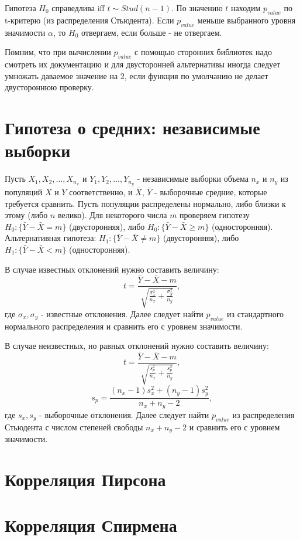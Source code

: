 Гипотеза $H_0$ справедлива iff $t \sim Stud(n - 1)$. По значению $t$ находим $p_{value}$ по t-критерю (из распределения Стьюдента). Если $p_{value}$ меньше выбранного уровня значимости $\alpha$, то $H_0$ отвергаем, если больше - не отвергаем.

Помним, что при вычислении $p_{value}$ с помощью сторонних библиотек надо смотреть их документацию и для двусторонней альтернативы иногда следует умножать даваемое значение на 2, если функция по умолчанию не делает двустороннюю проверку.  


\section{Гипотеза о средних: независимые выборки}

Пусть $X_1, X_2, ..., X_{n_x}$ и $Y_1, Y_2, ..., Y_{n_y}$ - независимые выборки объема $n_x$ и $n_y$ из популяций $X$ и $Y$ соответственно, и $\bar{X}$, $\bar{Y}$ - выборочные средние, которые требуется сравнить.
Пусть популяции распределены нормально, либо близки к этому (либо $n$ велико).
Для некоторого числа $m$ проверяем гипотезу $H_0: \{ \bar{Y} - \bar{X} = m \}$ (двусторонняя), либо $H_0: \{ \bar{Y} - \bar{X} \geqslant m \}$ (односторонняя). 
Альтернативная гипотеза: $H_1: \{ \bar{Y} - \bar{X} \neq m \}$ (двусторонняя), либо $H_1: \{ \bar{Y} - \bar{X} < m \}$ (односторонняя). 

В случае известных отклонений нужно составить величину:
$$
t = \frac{\bar{Y} - \bar{X} - m}{\sqrt{\frac{\sigma_x^2}{n_x} + \frac{\sigma_y^2}{n_y}}},
$$
где $\sigma_x, \sigma_y$ - известные отклонения. Далее следует найти $p_{value}$ из стандартного нормального распределения и сравнить его с уровнем значимости.

В случае неизвестных, но равных отклонений нужно составить величину:
$$
t = \frac{\bar{Y} - \bar{X} - m}{\sqrt{\frac{s_p^2}{n_x} + \frac{s_p^2}{n_y}}},
$$
$$
s_p = \frac{(n_x - 1)s_x^2 + (n_y - 1)s_y^2}{n_x + n_y - 2},
$$
где $s_x, s_y$ - выборочные отклонения. Далее следует найти $p_{value}$ из распределения Стьюдента с числом степеней свободы $n_x + n_y - 2$ и сравнить его с уровнем значимости.


\section{Корреляция Пирсона}


\section{Корреляция Спирмена}


